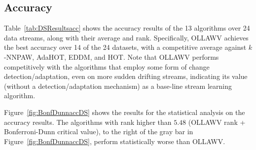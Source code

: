\documentclass[reqno]{vcuthesis}
\numberwithin{equation}{chapter}
\begin{document}
\subsection{Accuracy}
Table~\ref{tab:DSResultsacc} shows the accuracy results of the 13 algorithms over 24 data streams, along with their average and rank. Specifically, OLLAWV achieves the best accuracy over 14 of the 24 datasets, with a competitive average against $k$-NNPAW, AdaHOT, EDDM, and HOT. Note that OLLAWV performs competitively with the algorithms that employ some form of change detection/adaptation, even on more sudden drifting streams, indicating its value (without a detection/adaptation mechanism) as a base-line stream learning algorithm.

Figure~\ref{fig:BonfDunnaccDS} shows the results for the statistical analysis on the accuracy results. The algorithms with rank higher than $5.48$ (OLLAWV rank + Bonferroni-Dunn critical value), to the right of the gray bar in Figure~\ref{fig:BonfDunnaccDS}, perform statistically worse than OLLAWV. 
\end{document}
